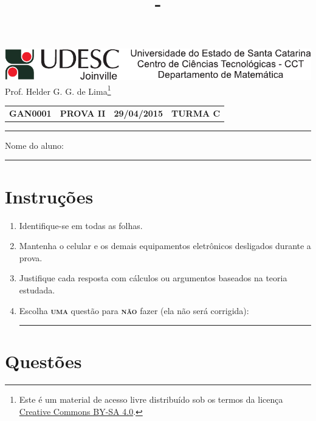 \documentclass[12pt,a4paper]{article}
\author{\eu}
\title{\tipo - \disciplina}
\date{\data}
\newcommand*\tipo{PROVA II}
\newcommand*\turma{TURMA C}
\newcommand*\disciplina{GAN0001}
\newcommand*\eu{Helder G. G. de Lima}
\newcommand*\data{29/04/2015}
\begin{document}
\thispagestyle{empty}
\begin{center}
\includegraphics{udesc_joinville_cabecalho.pdf}
\\ Prof. \eu\footnote{
Este é um material de acesso livre distribuído sob os termos da licença \href{https://creativecommons.org/licenses/by-sa/4.0/deed.pt_BR}{Creative Commons BY-SA 4.0}.}

\noindent\begin{tabular}{l c c r}
  \textbf{\disciplina}
& \textbf{\tipo}
& \textbf{\data}
& \textbf{\turma}
\end{tabular}\vspace{-0.3cm}
\noindent\rule{17cm}{0.01cm}
\end{center}

\noindent Nome do aluno: \rule{14cm}{0.01cm}

\section*{Instruções}

\begin{enumerate}
\renewcommand{\theenumi}{\Roman{enumi}}
\item Identifique-se em todas as folhas.
\item Mantenha o celular e os demais equipamentos eletrônicos desligados durante a prova.
\item Justifique cada resposta com cálculos ou argumentos baseados na teoria estudada.
\item Escolha \textsc{\textbf{uma}} questão para \textsc{\textbf{não}} fazer (ela não será corrigida): \rule{3cm}{0.01cm}
\end{enumerate}

\section*{Questões}
\end{document}
